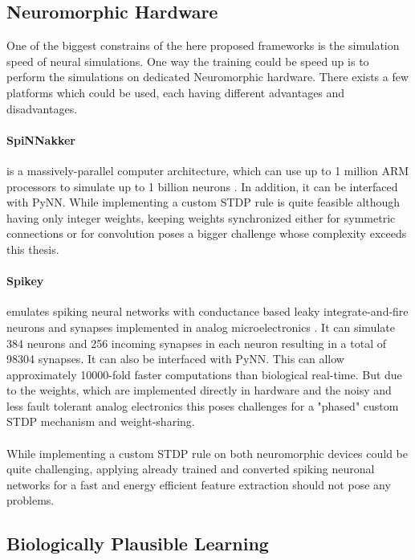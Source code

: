 \subsection{Neuromorphic Hardware} \label{c:neuhard}

One of the biggest constrains of the here proposed frameworks is the simulation speed of neural simulations.
One way the training could be speed up is to perform the simulations on dedicated Neuromorphic hardware. 
There exists a few platforms which could be used, each having different advantages and disadvantages.

\paragraph{SpiNNakker} \label{c:spinnakker}
is a massively-parallel computer architecture, which can use up to 1 million ARM processors to simulate up to 1 billion neurons \cite{jin2008efficient}. 
In addition, it can be interfaced with PyNN. 
While implementing a custom STDP rule is quite feasible although having only integer weights, keeping weights synchronized either for symmetric connections or for convolution poses a bigger challenge whose complexity exceeds this thesis.

\paragraph{Spikey} \label{c:spikey}
emulates spiking neural networks with conductance based leaky integrate-and-fire neurons and synapses implemented in analog microelectronics \cite{Pfeil1311}.
It can simulate 384 neurons and 256 incoming synapses in each neuron resulting in a total of 98304 synapses.
It can also be interfaced with PyNN.
This can allow approximately 10000-fold faster computations than biological real-time.
But due to the weights, which are implemented directly in hardware and the noisy and less fault tolerant analog electronics this poses challenges for a "phased" custom STDP mechanism and weight-sharing. 
\\
\\
While implementing a custom STDP rule on both neuromorphic devices could be quite challenging, applying already trained and converted spiking neuronal networks for a fast and energy efficient feature extraction should not pose any problems.  

\subsection{Biologically Plausible Learning} \label{c:biofuture}

